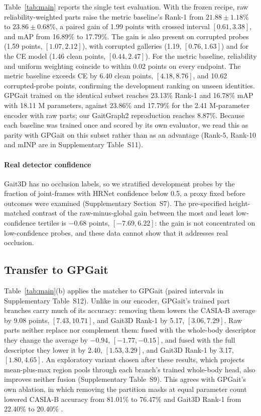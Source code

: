 \documentclass[journal]{IEEEtran}
\begin{document}
Table~\ref{tab:main} reports the single test evaluation. With the frozen
recipe, raw reliability-weighted parts raise the metric baseline's Rank-1 from
$21.88\pm1.18$\% to $23.86\pm0.68$\%, a paired gain of 1.99 points with crossed
interval $[0.61,3.38]$, and mAP from 16.89\% to 17.79\%. The gain is also present
on corrupted probes (1.59 points, $[1.07,2.12]$), with corrupted galleries
(1.19, $[0.76,1.63]$) and for the CE model (1.46 clean points,
$[0.44,2.47]$). For the metric baseline, reliability and uniform weighting
coincide to within 0.02 points on every endpoint. The metric baseline exceeds CE by 6.40 clean points,
$[4.18,8.76]$, and 10.62 corrupted-probe points, confirming the development
ranking on unseen identities. GPGait trained on the identical subset reaches
23.13\% Rank-1 and 16.78\% mAP with 18.11 M parameters, against 23.86\% and
17.79\% for the 2.41 M-parameter encoder with raw parts; our GaitGraph2
reproduction reaches 8.87\%. Because each baseline was trained once and scored
by its own evaluator, we read this as parity with GPGait on this subset rather
than as an advantage (Rank-5, Rank-10 and mINP are in Supplementary
Table~S11).

\paragraph{Real detector confidence}
Gait3D has no occlusion labels, so we stratified development probes by the
fraction of joint-frames with HRNet confidence below 0.5, a proxy fixed before
outcomes were examined (Supplementary Section~S7). The pre-specified
height-matched contrast of the raw-minus-global gain between the most and least
low-confidence tertiles is $-0.68$ points, $[-7.69,6.22]$: the gain is not
concentrated on low-confidence probes, and these data cannot show that it
addresses real occlusion.

\subsection{Transfer to GPGait}

Table~\ref{tab:main}(b) applies the matcher to GPGait (paired intervals in
Supplementary Table~S12). Unlike in our encoder, GPGait's trained part branches
carry much of its accuracy: removing them lowers the CASIA-B average by 9.08
points, $[7.43,10.71]$, and Gait3D Rank-1 by 5.17, $[3.06,7.29]$. Raw parts
neither replace nor complement them: fused with the whole-body descriptor they
change the average by $-0.94$, $[-1.77,-0.15]$, and fused with the full
descriptor they lower it by 2.40, $[1.53,3.29]$, and Gait3D Rank-1 by 3.17,
$[1.80,4.65]$. An exploratory variant chosen after these results, which projects
mean-plus-max region pools through each branch's trained whole-body head, also
improves neither fusion (Supplementary Table~S9). This agrees with GPGait's own
ablation, in which removing the partition masks at equal parameter count
lowered CASIA-B accuracy from 81.01\% to 76.47\% and Gait3D Rank-1 from 22.40\%
to 20.40\% \cite{fu2023gpgait}.
\end{document}
